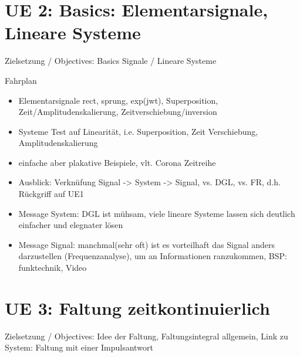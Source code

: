 

\newpage
\section{UE 2: Basics: Elementarsignale, Lineare Systeme}
Zielsetzung / Objectives:
Basics Signale / Lineare Systeme


Fahrplan
\begin{itemize}
\item Elementarsignale rect, sprung, exp(jwt), Superposition, Zeit/Amplitudenskalierung, Zeitverschiebung/inversion
\item Systeme Test auf Linearität, i.e. Superposition, Zeit Verschiebung, Amplitudenskalierung
\item einfache aber plakative Beispiele, vlt. Corona Zeitreihe
\item Ausblick: Verknüfung Signal -> System -> Signal, vs. DGL, vs. FR, d.h. Rückgriff auf UE1
\item Message System: DGL ist mühsam, viele lineare Systeme lassen sich deutlich einfacher und elegnater lösen
\item Message Signal: manchmal(sehr oft) ist es vorteilhaft das Signal anders darzustellen (Frequenzanalyse), um
an Informationen ranzukommen, BSP: funktechnik, Video
\end{itemize}


\newpage
\section{UE 3: Faltung zeitkontinuierlich}
Zielsetzung / Objectives: Idee der Faltung, Faltungsintegral allgemein, Link zu System: Faltung mit einer Impulsantwort

